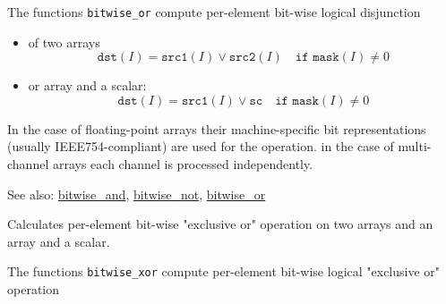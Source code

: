 The functions \texttt{bitwise\_or} compute per-element bit-wise logical disjunction
\begin{itemize}
    \item of two arrays
    \[\texttt{dst}(I) = \texttt{src1}(I) \vee \texttt{src2}(I)\quad\texttt{if mask}(I)\ne0\]
    \item or array and a scalar:
    \[\texttt{dst}(I) = \texttt{src1}(I) \vee \texttt{sc}\quad\texttt{if mask}(I)\ne0\]
\end{itemize}

In the case of floating-point arrays their machine-specific bit representations (usually IEEE754-compliant) are used for the operation. in the case of multi-channel arrays each channel is processed independently.

See also: \hyperref[cppfunc.bitwise.and]{bitwise\_and}, \hyperref[cppfunc.bitwise.not]{bitwise\_not}, \hyperref[cppfunc.bitwise.or]{bitwise\_or}

\label{cppfunc.bitwise.xor}
Calculates per-element bit-wise "exclusive or" operation on two arrays and an array and a scalar.

\begin{description}
\end{description}

The functions \texttt{bitwise\_xor} compute per-element bit-wise logical "exclusive or" operation

